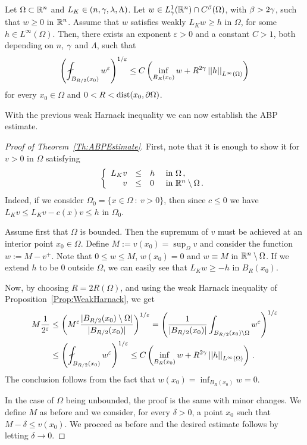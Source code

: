 \begin{proposition}
	
	\label{Prop:WeakHarnack}
		
	Let $\Omega \subset \mathbb{R}^n$ and $L_K\in (n,\gamma,\lambda, \Lambda)$. Let $w \in L^1_\gamma(\mathbb{R}^n)\cap C^{\beta}(\Omega)$, with $\beta > 2\gamma$, such that $w\geq 0$ in $\mathbb{R}^n$. Assume that $w$ satisfies weakly $L_K w \geq h$ in $\Omega$, for some $h\in L^\infty (\Omega)$. Then, there exists an exponent $\varepsilon > 0 $  and a constant $C > 1$, both depending on $n$, $\gamma$ and $\Lambda$, such that
	$$
	 \bpar{ \fint_{B_{R/2}(x_0)} w^\varepsilon}^{1/\varepsilon} \leq C \bpar{\inf_{B_{R}(x_0)} w + R^{2\s} \norm{h}_{L^{\infty}(\Omega)} }
	$$
	for every $x_0\in \Omega$ and $0<R<\operatorname{dist}(x_0, \partial \Omega)$.
\end{proposition}

With the previous weak Harnack inequality we can now establish the ABP estimate.

\begin{proof}[Proof of Theorem~\ref{Th:ABPEstimate}]
	First, note that it is enough to show it for $v > 0$ in $\Omega$ satisfying
	$$
	\left\{\begin{array}{rcll}
	L_K v &\leq & h & \text{ in } \Omega\,, \\
	v & \leq & 0 & \text{ in } \mathbb{R}^n\setminus \Omega\,.
	\end{array} \right.
	$$
	Indeed, if we consider $\Omega_0 = \{x \in \Omega \ : \ v > 0\}$, then since $c \leq 0$ we have $L_K v \leq L_K v - c(x)v \leq h$ in $\Omega_0$.
	
	Assume first that $\Omega$ is bounded. Then the supremum of $v$ must be achieved at an interior point $x_0\in \Omega$. Define	$M:= v(x_0) = \sup_\Omega v$ and consider the function $w := M - v^+$. Note that $0 \leq w \leq M$, $w(x_0) = 0$ and $w \equiv M$ in $\mathbb{R}^n \setminus \Omega$. If we extend $h$ to be $0$ outside $\Omega$, we can easily see that $L_K w \geq -h$ in $B_R(x_0)$.
	
	Now, by choosing $R= 2R(\Omega)$, and using the weak Harnack inequality of Proposition~\ref{Prop:WeakHarnack}, we get
	\begin{align*}
	M \dfrac{1}{2^\varepsilon} & \leq \bpar{M^{\varepsilon}\dfrac{|B_{R/2}(x_0)\setminus \Omega|}{|B_{R/2}(x_0)|}}^{1/\varepsilon}= \bpar{\dfrac{1}{|B_{R/2}(x_0)|} \int_{B_{R/2}(x_0)\setminus \Omega} w^\varepsilon}^{1/\varepsilon} \\
	& \leq \bpar{ \fint_{B_{R/2}(x_0)} w^\varepsilon}^{1/\varepsilon} \leq C \bpar{\inf_{B_{R}(x_0)} w + R^{2\s} \norm{h}_{L^{\infty}(\Omega)} }\,.
	\end{align*}
	The conclusion follows from the fact that $w(x_0)= \inf_{B_{R}(x_0)} w = 0$.
	
	In the case of $\Omega$ being unbounded, the proof is the same with minor changes. We define $M$ as before and we consider, for every $\delta > 0$, a point $x_0$ such that $M-\delta \leq v(x_0)$. We proceed as before and the desired estimate follows by letting $\delta \to 0$.
\end{proof}

